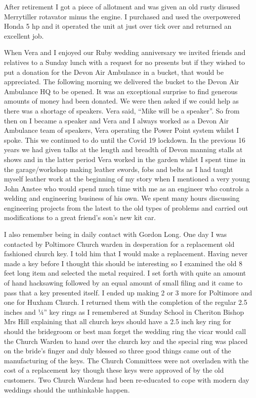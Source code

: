 After retirement I got a piece of allotment and was given an old rusty disused
Merrytiller rotavator minus the engine.  I purchased and used the overpowered
Honda 5 hp and it operated the unit at just over tick over and returned an
excellent job.

When Vera and I enjoyed our Ruby wedding anniversary we invited friends and
relatives to a Sunday lunch with a request for no presents but if they wished
to put a donation for the Devon Air Ambulance in a bucket, that would be
appreciated.  The following morning we delivered the bucket   to the Devon Air
Ambulance HQ to be opened.  It was an exceptional surprise to find generous
amounts of money had been donated.  We were then asked if we could help as
there was a shortage of speakers.  Vera said, ``Mike will be a speaker''.  So
from then on I became a speaker and Vera and I always worked as a Devon Air
Ambulance team of speakers, Vera operating the Power Point system whilst I
spoke.  This we continued to do until the Covid 19 lockdown.  In the previous
16 years we had given talks at the length and breadth of Devon manning stalls
at shows and in the latter period Vera worked in the garden whilst I spent time
in the garage/workshop making leather swords, fobs and belts as I had taught
myself leather work at the beginning of my story when I mentioned a very young
John Anstee who would spend much time with me as an engineer who controls a
welding and engineering business of his own.  We spent many hours discussing
engineering projects from the latest to the old types of problems and carried
out modifications to a great friend's son's new kit car.

I also remember being in daily contact with Gordon Long.  One day I was
contacted by Poltimore Church warden in desperation for a replacement old
fashioned church key.  I told him that I would make a replacement.  Having
never made a key before I thought this should be interesting so I examined the
old 8 feet long item and selected the metal required.  I set forth with quite
an amount of hand hacksawing followed by an equal amount of small filing and it
came to pass that a key presented itself.  I ended up making 2 or 3 more for
Poltimore and one for Huxham Church.  I returned them with the completion of
the regular 2.5 inches and ¼'' key rings as I remembered at Sunday School in
Cheriton Bishop Mrs Hill explaining that all church keys should have a 2.5 inch
key ring for should the bridegroom or best man forget the wedding ring the
vicar would call the Church Warden to hand over the church key and the special
ring was placed on the bride's finger and duly blessed so three good things
came out of the manufacturing of the keys.  The Church Committees were not
overladen with the cost of a replacement key though these keys were approved of
by the old customers. Two Church Wardens had been re-educated to cope with
modern day weddings should the unthinkable happen.

